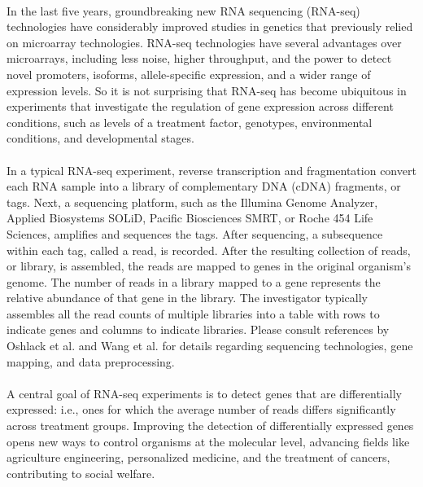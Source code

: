 \documentclass[10pt]{article}
\begin{document}
\paragraph{} \indent In the last five years, groundbreaking new RNA sequencing (RNA-seq) technologies have considerably improved studies in genetics that previously relied on microarray technologies. RNA-seq technologies have several advantages over microarrays, including less noise, higher throughput, and the power to detect novel promoters, isoforms, allele-specific expression, and a wider range of expression levels. So it is not surprising that RNA-seq has become ubiquitous in experiments that investigate the regulation of gene expression across different conditions, such as levels of a treatment factor, genotypes, environmental conditions, and developmental stages.

\paragraph{} \indent In a typical RNA-seq experiment, reverse transcription and fragmentation convert each RNA sample into a library of complementary DNA (cDNA) fragments, or tags. Next, a sequencing platform, such as the Illumina Genome Analyzer, Applied Biosystems SOLiD, Pacific Biosciences SMRT, or Roche 454 Life Sciences, amplifies and sequences the tags. After sequencing, a subsequence within each tag, called a read, is recorded. After the resulting collection of reads, or library, is assembled, the reads are mapped to genes in the original organism's genome. The number of reads in a library mapped to a gene represents the relative abundance of that gene in the library. The investigator typically assembles all the read counts of multiple libraries into a table with rows to indicate genes and columns to indicate libraries. Please consult references by Oshlack et al. \cite{oshlack} and Wang et al. \cite{wang} for details regarding sequencing technologies, gene mapping, and data preprocessing.

\paragraph{} \indent A central goal of RNA-seq experiments is to detect genes that are differentially expressed: i.e., ones for which the average number of reads differs significantly across treatment groups. Improving the detection of differentially expressed genes opens new ways to control organisms at the molecular level, advancing fields like agriculture engineering, personalized medicine, and the treatment of cancers, contributing to social welfare.
\end{document}
